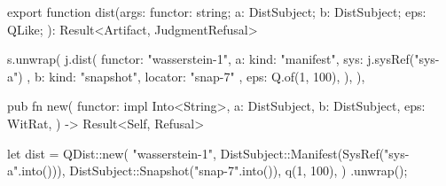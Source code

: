 \begin{tssrc}
export function dist(args: {
  functor: string;
  a: DistSubject;
  b: DistSubject;
  eps: QLike;
}): Result<Artifact, JudgmentRefusal>
\end{tssrc}
\begin{tssrc}
s.unwrap(
  j.dist({
    functor: "wasserstein-1",
    a: { kind: "manifest", sys: j.sysRef("sys-a") },
    b: { kind: "snapshot", locator: "snap-7" },
    eps: Q.of(1, 100),
  }),
),
\end{tssrc}
\begin{rustsrc}
pub fn new(
    functor: impl Into<String>,
    a: DistSubject,
    b: DistSubject,
    eps: WitRat,
) -> Result<Self, Refusal>
\end{rustsrc}
\begin{rustsrc}
let dist = QDist::new(
    "wasserstein-1",
    DistSubject::Manifest(SysRef("sys-a".into())),
    DistSubject::Snapshot("snap-7".into()),
    q(1, 100),
)
.unwrap();
\end{rustsrc}
